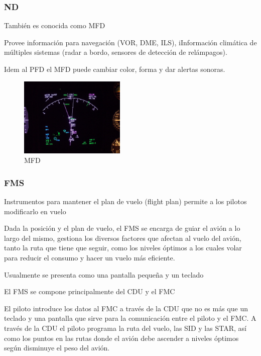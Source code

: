 \subsubsection{\ac{ND}}
\label{sec:01.nd}

Tambi\'en es conocida como \ac{MFD}

    Provee informaci\'on para navegaci\'on (VOR, DME, ILS), iInformaci\'on clim\'atica de m\'ultiples sistemas (radar a bordo, sensores de detecci\'on de rel\'ampagos).

    Idem al PFD el MFD puede cambiar color, forma y dar alertas  sonoras.

    \begin{figure}[!htb]\centering
      
      \includegraphics[width=0.45\textwidth]{01.tablero.instrumentos/U01.imagenes/1.4.pantalla.electronica/Navigation_Display_(ND)_on_Boeing_747-400.jpg}
      
      \caption{MFD}
  \label{fig:01.MFD}
\end{figure}

\subsubsection{\ac{FMS}}
\label{sec:01.FMS}

   Instrumentos para mantener el plan de vuelo (flight plan) permite
    a los pilotos modificarlo en vuelo

    Dada la posici\'on y el plan de vuelo, el  \ac{FMS} se encarga de guiar
    el avi\'on a lo largo del mismo, gestiona los diversos factores
    que afectan al vuelo del avi\'on, tanto la ruta que tiene que
    seguir, como los niveles \'optimos a los cuales volar para reducir
    el consumo y hacer un vuelo m\'as eficiente.


    Usualmente se presenta como una pantalla peque\~na y un teclado

    El \ac{FMS} se compone principalmente del \ac{CDU} y 
    el \ac{FMC}
 
El piloto introduce los datos al \ac{FMC} a trav\'es de la \ac{CDU} que no es m\'as que un teclado 
y una pantalla que sirve para la comunicaci\'on entre el piloto y el \ac{FMC}. 
A trav\'es de la \ac{CDU} el piloto programa la ruta del vuelo, las \ac{SID}  
y las \ac{STAR}, as\'i como los puntos en las rutas donde el avi\'on debe ascender 
a niveles \'optimos seg\'un disminuye el peso del avi\'on.

